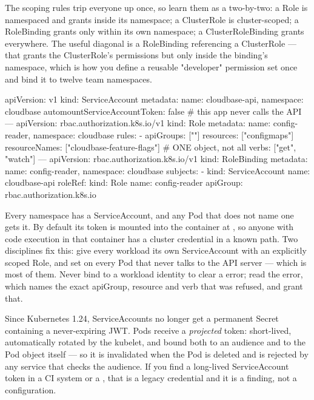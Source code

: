 The scoping rules trip everyone up once, so learn them as a two-by-two: a Role is namespaced and grants inside its namespace; a ClusterRole is cluster-scoped; a RoleBinding grants only within its own namespace; a ClusterRoleBinding grants everywhere. The useful diagonal is a RoleBinding referencing a ClusterRole --- that grants the ClusterRole's permissions but only inside the binding's namespace, which is how you define a reusable "developer" permission set once and bind it to twelve team namespaces.

\begin{k8sbox}
apiVersion: v1
kind: ServiceAccount
metadata: { name: cloudbase-api, namespace: cloudbase }
automountServiceAccountToken: false   # this app never calls the API
---
apiVersion: rbac.authorization.k8s.io/v1
kind: Role
metadata: { name: config-reader, namespace: cloudbase }
rules:
  - apiGroups: [""]
    resources: ["configmaps"]
    resourceNames: ["cloudbase-feature-flags"]   # ONE object, not all
    verbs: ["get", "watch"]
---
apiVersion: rbac.authorization.k8s.io/v1
kind: RoleBinding
metadata: { name: config-reader, namespace: cloudbase }
subjects:
  - kind: ServiceAccount
    name: cloudbase-api
roleRef:
  kind: Role
  name: config-reader
  apiGroup: rbac.authorization.k8s.io
\end{k8sbox}

\begin{secwarn}
Every namespace has a  ServiceAccount, and any Pod that does not name one gets it. By default its token is mounted into the container at , so anyone with code execution in that container has a cluster credential in a known path. Two disciplines fix this: give every workload its own ServiceAccount with an explicitly scoped Role, and set  on every Pod that never talks to the API server --- which is most of them. Never bind  to a workload identity to clear a  error; read the error, which names the exact apiGroup, resource and verb that was refused, and grant that.
\end{secwarn}

\begin{behind}
Since Kubernetes 1.24, ServiceAccounts no longer get a permanent Secret containing a never-expiring JWT. Pods receive a \emph{projected} token: short-lived, automatically rotated by the kubelet, and bound both to an audience and to the Pod object itself --- so it is invalidated when the Pod is deleted and is rejected by any service that checks the audience. If you find a long-lived ServiceAccount token in a CI system or a , that is a legacy credential and it is a finding, not a configuration.
\end{behind}

